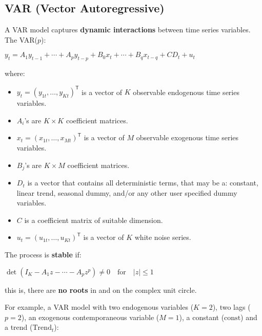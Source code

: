 \documentclass[10pt, a4paper, landscape]{article}
\newcommand{\tr}{\mathsf{T}}
\begin{document}
	\begin{multicols}{2}
		\section*{VAR (Vector Autoregressive)}
		
		A VAR model captures \textbf{dynamic interactions} between time series variables. The VAR($p$):
		
		\begin{center}
			$y_{t} = A_{1} y_{t - 1}+ \cdots + A_{p} y_{t - p}+ B_{0} x_{t} + \cdots + B_{q} x_{t - q}+ CD_{t} + u_{t}$
		\end{center}
		
		where:
		
		\begin{itemize}[leftmargin=*]
			\item $y_{t} = (y_{1t}, \ldots, y_{Kt})^{\tr}$ is a vector of $K$ observable endogenous time series variables.
			\item $A_{i}$'s are $K \times K$ coefficient matrices.
			\item $x_{t} = (x_{1t}, \ldots, x_{Mt})^{\tr}$ is a vector of $M$ observable exogenous time series variables.
			\item $B_{j}$'s are $K \times M$ coefficient matrices.
			\item $D_{t}$ is a vector that contains all deterministic terms, that may be a: constant, linear trend, seasonal dummy, and/or any other user specified dummy variables.
			\item $C$ is a coefficient matrix of suitable dimension.
			\item $u_{t} = (u_{1t}, \ldots, u_{Kt})^{\tr}$ is a vector of $K$ white noise series.
		\end{itemize}
		
		The process is \textbf{stable} if:
		
		\begin{center}
			$\det(I_{K} - A_{1} z - \cdots - A_{p} z^{p}) \neq 0 \quad \mathrm{for}\quad \lvert z \rvert \leq 1$
		\end{center}
		
		\quad this is, there are \textbf{no roots} in and on the complex unit circle.
		
		For example, a VAR model with two endogenous variables ($K = 2$), two lags ($p = 2$), an exogenous contemporaneous variable ($M = 1$), a constant ($\mathrm{const}$) and a trend ($\mathrm{Trend}_{t}$):
		

\end{multicols}
\end{document}
